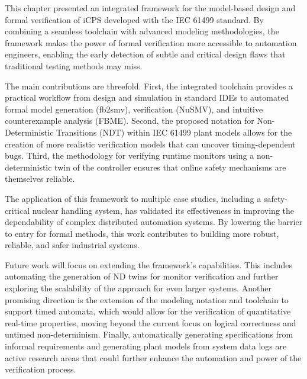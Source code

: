 This chapter presented an integrated framework for the model-based design and formal verification of iCPS developed with the IEC 61499 standard. By combining a seamless toolchain with advanced modeling methodologies, the framework makes the power of formal verification more accessible to automation engineers, enabling the early detection of subtle and critical design flaws that traditional testing methods may miss.

The main contributions are threefold. First, the integrated toolchain provides a practical workflow from design and simulation in standard IDEs to automated formal model generation (fb2smv), verification (NuSMV), and intuitive counterexample analysis (FBME). Second, the proposed notation for Non-Deterministic Transitions (NDT) within IEC 61499 plant models allows for the creation of more realistic verification models that can uncover timing-dependent bugs. Third, the methodology for verifying runtime monitors using a non-deterministic twin of the controller ensures that online safety mechanisms are themselves reliable.

The application of this framework to multiple case studies, including a safety-critical nuclear handling system, has validated its effectiveness in improving the dependability of complex distributed automation systems. By lowering the barrier to entry for formal methods, this work contributes to building more robust, reliable, and safer industrial systems.

Future work will focus on extending the framework's capabilities. This includes automating the generation of ND twins for monitor verification and further exploring the scalability of the approach for even larger systems. Another promising direction is the extension of the modeling notation and toolchain to support timed automata, which would allow for the verification of quantitative real-time properties, moving beyond the current focus on logical correctness and untimed non-determinism. Finally, automatically generating specifications from informal requirements and generating plant models from system data logs are active research areas that could further enhance the automation and power of the verification process.
